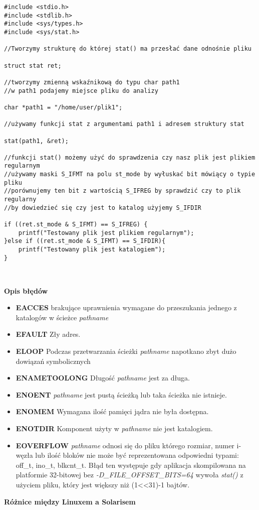 \documentclass{article}
\begin{document}
\begin{verbatim}
#include <stdio.h>
#include <stdlib.h>
#include <sys/types.h>
#include <sys/stat.h>

//Tworzymy strukturę do której stat() ma przesłać dane odnośnie pliku

struct stat ret; 

//tworzymy zmienną wskaźnikową do typu char path1 
//w path1 podajemy miejsce pliku do analizy

char *path1 = "/home/user/plik1"; 

//używamy funkcji stat z argumentami path1 i adresem struktury stat

stat(path1, &ret); 

//funkcji stat() możemy użyć do sprawdzenia czy nasz plik jest plikiem regularnym
//używamy maski S_IFMT na polu st_mode by wyłuskać bit mówiący o typie pliku
//porównujemy ten bit z wartością S_IFREG by sprawdzić czy to plik regularny
//by dowiedzieć się czy jest to katalog użyjemy S_IFDIR

if ((ret.st_mode & S_IFMT) == S_IFREG) {
    printf("Testowany plik jest plikiem regularnym");
}else if ((ret.st_mode & S_IFMT) == S_IFDIR){
 	printf("Testowany plik jest katalogiem");
}



\end{verbatim}


\textbf{Opis błędów}
\begin{itemize}
\item \textbf{EACCES} brakujące uprawnienia wymagane do przeszukania jednego z katalogów w ścieżce \textit{pathname}
\item \textbf{EFAULT} Zły adres.
\item \textbf{ELOOP} Podczas przetwarzania ścieżki \textit{pathname} napotkano zbyt dużo dowiązań symbolicznych
\item \textbf{ENAMETOOLONG} Długość \textit{pathname} jest za długa.
\item \textbf{ENOENT} \textit{pathname} jest pustą ścieżką lub taka ścieżka nie istnieje.

\item \textbf{ENOMEM}  Wymagana ilość pamięci jądra nie była dostępna.
\item \textbf{ENOTDIR}  Komponent użyty w \textit{pathname} nie jest katalogiem.
\item \textbf{EOVERFLOW} \textit{pathname} odnosi się do pliku którego rozmiar, numer i-węzła lub ilość bloków nie może być reprezentowana odpowiedni typami: off\_t, ino\_t, blkcnt\_t. Błąd ten występuje gdy aplikacja skompilowana na platformie 32-bitowej bez \textit{-D\_FILE\_OFFSET\_BITS=64} wywoła \textit{stat()} z użyciem pliku, który jest większy niż (1<<31)-1 bajtów.



\end{itemize}
\textbf{Różnice między Linuxem a Solarisem}
\end{document}
